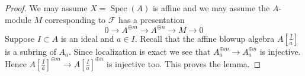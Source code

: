 \documentclass[10pt,a4paper]{amsart}
\theoremstyle{plain}
\theoremstyle{definition}
\theoremstyle{remark}
\numberwithin{equation}{subsection}
\def\Spec{\mathop{\mathrm{Spec}}}
\begin{document}
\begin{proof}
We may assume $X = \Spec(A)$ is affine and we may assume the $A$-module $M$
corresponding to $\mathcal{F}$ has a presentation
$$
0 \to A^{\oplus m} \to A^{\oplus n} \to M \to 0
$$
Suppose $I \subset A$ is an ideal and $a \in I$. Recall that the
affine blowup algebra $A[\frac{I}{a}]$ is a subring of $A_a$.
Since localization is exact we see that $A_a^{\oplus m} \to A_a^{\oplus n}$
is injective. Hence $A[\frac{I}{a}]^{\oplus m} \to A[\frac{I}{a}]^{\oplus n}$
is injective too. This proves the lemma.
\end{proof}
\end{document}
